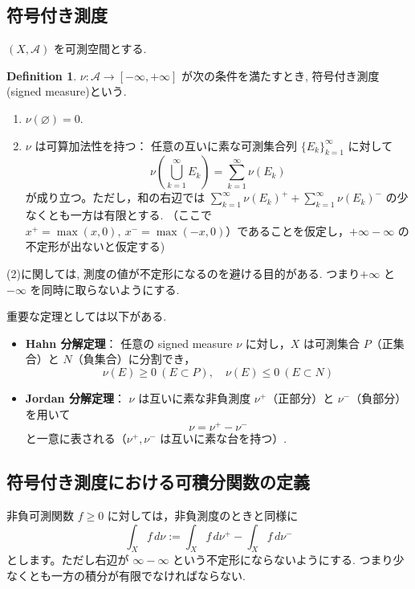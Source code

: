 \documentclass[dvipdfmx,a4paper,11pt]{article} %
\theoremstyle{definition}
\newtheorem{defn}[thm]{Definition}
\theoremstyle{remark}
\numberwithin{equation}{section}
\begin{document}
\subsection*{符号付き測度}
\((X, \mathcal{A})\) を可測空間とする.

\begin{tcolorbox}[mybox]
\begin{defn}
\(\nu : \mathcal{A} \to [-\infty, +\infty]\) が次の条件を満たすとき, 符号付き測度(signed measure)という. 
\begin{enumerate}
    \item \(\nu(\varnothing) = 0\).
    \item \(\nu\) は可算加法性を持つ：
    任意の互いに素な可測集合列 \(\{E_k\}_{k=1}^\infty\) に対して
    \[
    \nu\left( \bigcup_{k=1}^\infty E_k \right) = \sum_{k=1}^\infty \nu(E_k)
    \]
    が成り立つ。ただし，和の右辺では
    \(\sum_{k=1}^\infty \nu(E_k)^+ + \sum_{k=1}^\infty \nu(E_k)^-\) の少なくとも一方は有限とする. 
    （ここで \(x^+ = \max(x,0), \ x^- = \max(-x,0)\)）であることを仮定し，\(+\infty - \infty\) の不定形が出ないと仮定する)
\end{enumerate}
\end{defn}
\end{tcolorbox}
(2)に関しては,  測度の値が不定形になるのを避ける目的がある. つまり\(+\infty\) と \(-\infty\) を同時に取らないようにする. 

重要な定理としては以下がある. 
\begin{itemize}
    \item \textbf{Hahn 分解定理}：  
    任意の signed measure \(\nu\) に対し，\(X\) は可測集合 \(P\)（正集合）と \(N\)（負集合）に分割でき，
    \[
    \nu(E) \ge 0 \ (E \subset P), \quad \nu(E) \le 0 \ (E \subset N)
    \]
    \item \textbf{Jordan 分解定理}：  
    \(\nu\) は互いに素な非負測度 \(\nu^+\)（正部分）と \(\nu^-\)（負部分）を用いて
    \[
    \nu = \nu^+ - \nu^-
    \]
    と一意に表される（\(\nu^+, \nu^-\) は互いに素な台を持つ）.
\end{itemize}


\subsection*{符号付き測度における可積分関数の定義}

非負可測関数 \(f \ge 0\) に対しては，非負測度のときと同様に
\[
\int_X f \, d\nu := \int_X f \, d\nu^+ - \int_X f \, d\nu^-
\]
とします。ただし右辺が \(\infty - \infty\) という不定形にならないようにする. つまり少なくとも一方の積分が有限でなければならない. 
\end{document}
